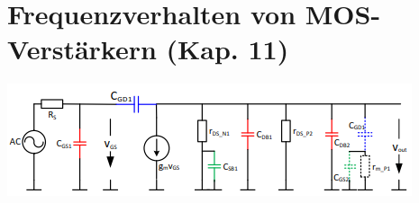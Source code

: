 
\section{Frequenzverhalten von MOS-Verstärkern (Kap. 11)}
\includegraphics[width=1\linewidth]{chapters/Frequenzverhalten/images/parasitaere_kapazitaeten}
